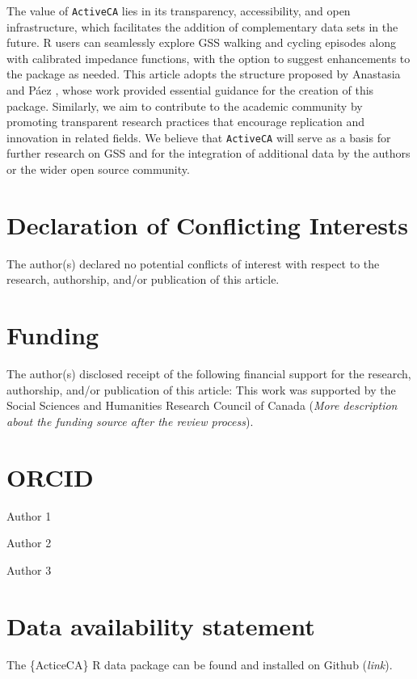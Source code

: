 \documentclass[Royal,times,sageh]{sagej}
\begin{document}
The value of \texttt{ActiveCA} lies in its transparency, accessibility,
and open infrastructure, which facilitates the addition of complementary
data sets in the future. R users can seamlessly explore GSS walking and
cycling episodes along with calibrated impedance functions, with the
option to suggest enhancements to the package as needed. This article
adopts the structure proposed by Anastasia and Páez
\citeyearpar{soukhov2023}, whose work provided essential guidance for
the creation of this package. Similarly, we aim to contribute to the
academic community by promoting transparent research practices that
encourage replication and innovation in related fields. We believe that
\texttt{ActiveCA} will serve as a basis for further research on GSS and
for the integration of additional data by the authors or the wider open
source community.

\hypertarget{declaration-of-conflicting-interests}{%
\section{Declaration of Conflicting
Interests}\label{declaration-of-conflicting-interests}}

The author(s) declared no potential conflicts of interest with respect
to the research, authorship, and/or publication of this article.

\hypertarget{funding}{%
\section{Funding}\label{funding}}

The author(s) disclosed receipt of the following financial support for
the research, authorship, and/or publication of this article: This work
was supported by the Social Sciences and Humanities Research Council of
Canada (\emph{More description about the funding source after the review
process}).

\hypertarget{orcid}{%
\section{ORCID}\label{orcid}}

Author 1

Author 2

Author 3

\hypertarget{data-availability-statement}{%
\section{Data availability
statement}\label{data-availability-statement}}

The \{ActiceCA\} R data package can be found and installed on Github
(\emph{link}).



\end{document}
